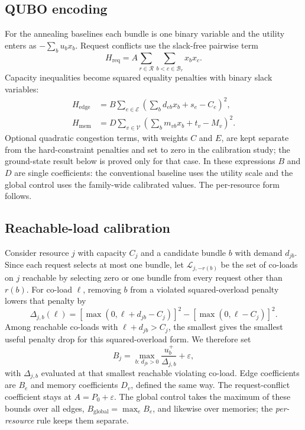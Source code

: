 \documentclass[pdflatex,sn-nature]{sn-jnl}
\newcommand{\Bset}{\mathcal{B}}
\newcommand{\Rset}{\mathcal{R}}
\newcommand{\Eset}{\mathcal{E}}
\newcommand{\Vset}{\mathcal{V}}
\newcommand{\eps}{\varepsilon}
\theoremstyle{plain}
\theoremstyle{remark}
\begin{document}
\subsection{QUBO encoding}

For the annealing baselines each bundle is one binary variable and the utility enters as $-\sum_bu_bx_b$. Request conflicts use the slack-free pairwise term
\begin{equation}
H_{\mathrm{req}}=A\sum_{r\in\Rset}\sum_{b<c\in\Bset_r}x_bx_c.
\end{equation}
Capacity inequalities become squared equality penalties with binary slack variables:
\begin{align}
H_{\mathrm{edge}}&=B\sum_{e\in\Eset}\left(\sum_bd_{eb}x_b+s_e-C_e\right)^2,\\
H_{\mathrm{mem}}&=D\sum_{v\in\Vset}\left(\sum_bm_{vb}x_b+t_v-M_v\right)^2.
\end{align}
Optional quadratic congestion terms, with weights $C$ and $E$, are kept separate from the hard-constraint penalties and set to zero in the calibration study; the ground-state result below is proved only for that case. In these expressions $B$ and $D$ are single coefficients: the conventional baseline uses the utility scale and the global control uses the family-wide calibrated values. The per-resource form follows.

\subsection{Reachable-load calibration}
Consider resource $j$ with capacity $C_j$ and a candidate bundle $b$ with demand $d_{jb}$. Since each request selects at most one bundle, let $\mathcal{L}_{j,-r(b)}$ be the set of co-loads on $j$ reachable by selecting zero or one bundle from every request other than $r(b)$. For co-load $\ell$, removing $b$ from a violated squared-overload penalty lowers that penalty by
\begin{equation}
\Delta_{j,b}(\ell)= [\max(0,\ell+d_{jb}-C_j)]^2-[\max(0,\ell-C_j)]^2.\label{eq:delta}
\end{equation}
Among reachable co-loads with $\ell+d_{jb}>C_j$, the smallest gives the smallest useful penalty drop for this squared-overload form. We therefore set
\begin{equation}
B_j=\max_{b:\,d_{jb}>0}\frac{u_b^+}{\Delta_{j,b}}+\eps,\label{eq:resourceB}
\end{equation}
with $\Delta_{j,b}$ evaluated at that smallest reachable violating co-load. Edge coefficients are $B_e$ and memory coefficients $D_v$, defined the same way. The request-conflict coefficient stays at $A=P_0+\eps$. The global control takes the maximum of these bounds over all edges, $B_{\mathrm{global}}=\max_e B_e$, and likewise over memories; the \emph{per-resource} rule keeps them separate.
\end{document}
